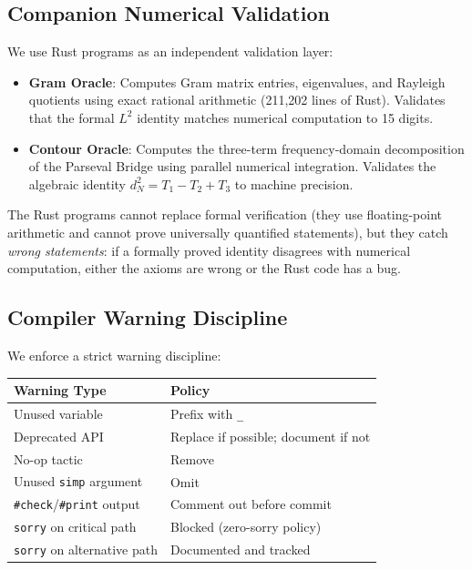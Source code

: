 \documentclass[11pt,a4paper]{article}
\theoremstyle{definition}
\newcommand{\lean}[1]{\texttt{#1}}
\begin{document}
\subsection{Companion Numerical Validation}

We use Rust programs as an independent validation layer:

\begin{itemize}
  \item \textbf{Gram Oracle}: Computes Gram matrix entries, eigenvalues,
    and Rayleigh quotients using exact rational arithmetic (211,202
    lines of Rust). Validates that the formal $L^2$ identity
    matches numerical computation to 15 digits.
  \item \textbf{Contour Oracle}: Computes the three-term frequency-domain
    decomposition of the Parseval Bridge using parallel numerical
    integration. Validates the algebraic identity
    $d_N^2 = T_1 - T_2 + T_3$ to machine precision.
\end{itemize}

The Rust programs cannot replace formal verification (they use
floating-point arithmetic and cannot prove universally quantified
statements), but they catch \emph{wrong statements}: if a formally
proved identity disagrees with numerical computation, either the
axioms are wrong or the Rust code has a bug.

\subsection{Compiler Warning Discipline}

We enforce a strict warning discipline:

\begin{center}
\begin{tabular}{@{}ll@{}}
\toprule
\textbf{Warning Type} & \textbf{Policy} \\
\midrule
Unused variable & Prefix with \lean{\_} \\
Deprecated API & Replace if possible; document if not \\
No-op tactic & Remove \\
Unused \lean{simp} argument & Omit \\
\lean{\#check}/\lean{\#print} output & Comment out before commit \\
\lean{sorry} on critical path & Blocked (zero-sorry policy) \\
\lean{sorry} on alternative path & Documented and tracked \\
\bottomrule
\end{tabular}
\end{center}
\end{document}
